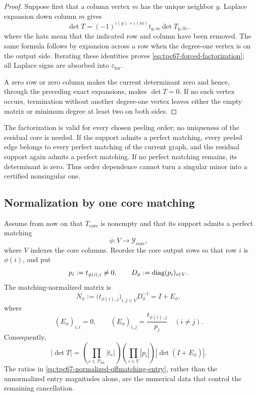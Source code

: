 \begin{proof}
Suppose first that a column vertex \(m\) has the unique neighbor \(y\).
Laplace expansion down column \(m\) gives
\[
 \det T=(-1)^{\iota(y)+\iota(m)}t_{y,m}
 \det T_{\widehat y,\widehat m},
\]
where the hats mean that the indicated row and column have been removed.
The same formula follows by expansion across a row when the degree-one
vertex is on the output side.  Iterating these identities proves
\eqref{eq:tpc67-forced-factorization}; all Laplace signs are absorbed into
\(\varepsilon_{\mathrm{for}}\).

A zero row or zero column makes the current determinant zero and hence,
through the preceding exact expansions, makes \(\det T=0\).  If no such
vertex occurs, termination without another degree-one vertex leaves either
the empty matrix or minimum degree at least two on both sides.
\end{proof}

\begin{remark}
\label{rem:tpc67-peeling-order}
The factorization is valid for every chosen peeling order; no uniqueness of
the residual core is needed.  If the support admits a perfect matching,
every peeled edge belongs to every perfect matching of the current graph,
and the residual support again admits a perfect matching.  If no perfect
matching remains, its determinant is zero.  Thus order dependence cannot
turn a singular minor into a certified nonsingular one.
\end{remark}

\subsection{Normalization by one core matching}

Assume from now on that \(T_{\mathrm{core}}\) is nonempty and that its
support admits a perfect matching
\[
 \phi:V\longrightarrow\mathcal Y_{\mathrm{core}},
\]
where \(V\) indexes the core columns.  Reorder the core output rows so that
row \(i\) is \(\phi(i)\), and put
\begin{equation}
 p_i:=t_{\phi(i),i}\ne0,
 \qquad
 D_\phi:=\operatorname{diag}(p_i)_{i\in V}.
 \label{eq:tpc67-matching-pivots}
\end{equation}
The matching-normalized matrix is
\begin{equation}
 N_\phi
 :=
 \bigl(t_{\phi(i),j}\bigr)_{i,j\in V}D_\phi^{-1}
 =I+E_\phi,
 \label{eq:tpc67-matching-normalization}
\end{equation}
where
\begin{equation}
 (E_\phi)_{i,i}=0,
 \qquad
 (E_\phi)_{i,j}
 =
 \frac{t_{\phi(i),j}}{p_j}
 \quad(i\ne j).
 \label{eq:tpc67-normalized-offmatching-entry}
\end{equation}
Consequently,
\begin{equation}
 |\det T|
 =
 \left(\prod_{e\in\mathcal P_{\mathrm{for}}}|t_e|\right)
 \left(\prod_{i\in V}|p_i|\right)
 |\det(I+E_\phi)|.
 \label{eq:tpc67-full-core-normalization}
\end{equation}
The ratios in \eqref{eq:tpc67-normalized-offmatching-entry}, rather than the
unnormalized entry magnitudes alone, are the numerical data that control
the remaining cancellation.


